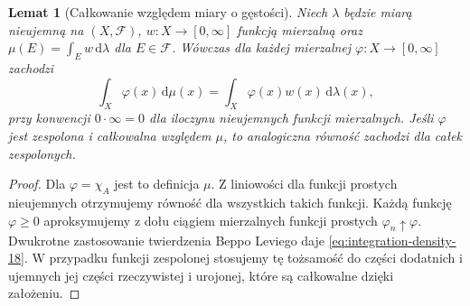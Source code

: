 \documentclass[11pt,a4paper,oneside]{book}
\numberwithin{equation}{chapter}
\theoremstyle{plain}
\newtheorem{lemat}[twierdzenie]{Lemat}
\theoremstyle{definition}
\theoremstyle{remark}
\begin{document}
\begin{lemat}[Całkowanie względem miary o gęstości]
\label{lem:integration-density-18}
Niech $\lambda$ będzie miarą nieujemną na $(X,\mathcal F)$,
$w:X\to[0,\infty]$ funkcją mierzalną oraz
$\mu(E)=\int_Ew\,\mathrm d\lambda$ dla $E\in\mathcal F$.
Wówczas dla każdej mierzalnej $\varphi:X\to[0,\infty]$
zachodzi
\begin{equation}\label{eq:integration-density-18}
\int_X\varphi(x)\,\mathrm d\mu(x)
=\int_X\varphi(x)w(x)\,\mathrm d\lambda(x),
\end{equation}
przy konwencji $0\cdot\infty=0$ dla iloczynu
nieujemnych funkcji mierzalnych. Jeśli $\varphi$ jest
zespolona i całkowalna względem $\mu$, to analogiczna
równość zachodzi dla całek zespolonych.
\end{lemat}
\begin{proof}
Dla $\varphi=\chi_A$ jest to definicja $\mu$.
Z liniowości dla funkcji prostych nieujemnych otrzymujemy
równość dla wszystkich takich funkcji. Każdą funkcję
$\varphi\ge0$ aproksymujemy z dołu ciągiem mierzalnych
funkcji prostych $\varphi_n\uparrow\varphi$.
Dwukrotne zastosowanie twierdzenia Beppo Leviego
daje \eqref{eq:integration-density-18}. W przypadku
funkcji zespolonej stosujemy tę tożsamość do części
dodatnich i ujemnych jej części rzeczywistej i urojonej,
które są całkowalne dzięki założeniu.
\end{proof}
\end{document}
